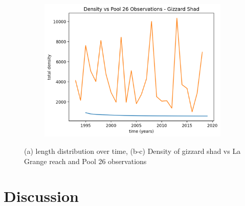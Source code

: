 \documentclass[11pt,oneside]{amsart}
\theoremstyle{definition}
\begin{document}
\begin{figure}
\begin{subfigure}[b]{.32\textwidth}
   \includegraphics[width=\textwidth]{figures/pool26.png}
     \caption{}
\label{fig:pool26}
\end{subfigure}
\caption{(a) length distribution over time, (b-c) Density of gizzard shad vs La Grange reach and Pool 26 observations}
\end{figure}    


\section{Discussion}
\end{document}
